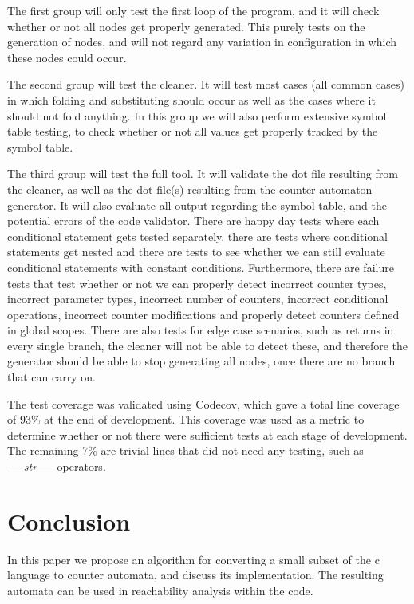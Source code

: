 \documentclass[12pt]{article}
\begin{document}
The first group will only test the first loop of the program, and it will check whether or not all nodes get properly generated. This purely tests on the generation of nodes, and will not regard any variation in configuration in which these nodes could occur.

The second group will test the cleaner. It will test most cases (all common cases) in which folding and substituting should occur as well as the cases where it should not fold anything. In this group we will also perform extensive symbol table testing, to check whether or not all values get properly tracked by the symbol table.

The third group will test the full tool. It will validate the dot file resulting from the cleaner, as well as the dot file(s) resulting from the counter automaton generator. It will also evaluate all output regarding the symbol table, and the potential errors of the code validator. There are happy day tests where each conditional statement gets tested separately, there are tests where conditional statements get nested and there are tests to see whether we can still evaluate conditional statements with constant conditions. Furthermore, there are failure tests that test whether or not we can properly detect incorrect counter types, incorrect parameter types, incorrect number of counters, incorrect conditional operations, incorrect counter modifications and properly detect counters defined in global scopes. There are also tests for edge case scenarios, such as returns in every single branch, the cleaner will not be able to detect these, and therefore the generator should be able to stop generating all nodes, once there are no branch that can carry on.

The test coverage was validated using Codecov, which gave a total line coverage of 93\% at the end of development. This coverage was used as a metric to determine whether or not there were sufficient tests at each stage of development. The remaining 7\% are trivial lines that did not need any testing, such as \textit{\_\_str\_\_} operators.

\section{Conclusion}
In this paper we propose an algorithm for converting a small subset of the c language to counter automata, and discuss its implementation. The resulting automata can be used in reachability analysis within the code. 
\end{document}

